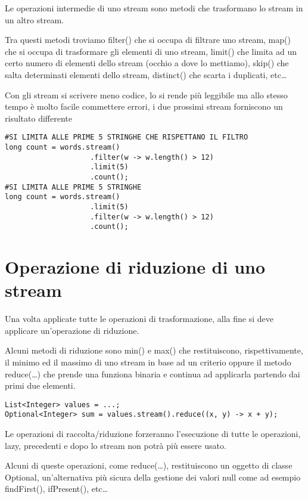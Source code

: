 Le operazioni intermedie di uno stream sono metodi che trasformano lo stream in un altro stream.

Tra questi metodi troviamo filter() che si occupa di filtrare uno stream, map() che si occupa di trasformare gli elementi di uno stream, limit() che limita ad un
certo numero di elementi dello stream (occhio a dove lo mettiamo), skip() che salta determinati elementi dello stream, distinct() che scarta i duplicati, etc\dots

Con gli stream si scrivere meno codice, lo si rende più leggibile ma allo stesso tempo è molto facile commettere errori, i due prossimi stream forniscono un risultato 
differente

\begin{lstlisting}
#SI LIMITA ALLE PRIME 5 STRINGHE CHE RISPETTANO IL FILTRO
long count = words.stream()
                    .filter(w -> w.length() > 12)
                    .limit(5)
                    .count();
#SI LIMITA ALLE PRIME 5 STRINGHE                    
long count = words.stream()
                    .limit(5)
                    .filter(w -> w.length() > 12)
                    .count();
\end{lstlisting}

\section{Operazione di riduzione di uno stream}

Una volta applicate tutte le operazioni di trasformazione, alla fine si deve applicare un’operazione di riduzione.

Alcuni metodi di riduzione sono min() e max() che restituiscono, rispettivamente, il minimo ed il massimo di uno stream in base ad un criterio oppure il metodo reduce(\dots)
che prende una funziona binaria e continua ad applicarla partendo dai primi due elementi.
\begin{lstlisting}
List<Integer> values = ...;
Optional<Integer> sum = values.stream().reduce((x, y) -> x + y);
\end{lstlisting}

Le operazioni di raccolta/riduzione forzeranno l’esecuzione di tutte le operazioni, lazy, precedenti e dopo lo stream non potrà più essere usato.

Alcuni di queste operazioni, come reduce(\dots), restituiscono un oggetto di classe Optional, un’alternativa più sicura della gestione dei valori null come ad esempio findFirst(), 
ifPresent(), etc\dots

